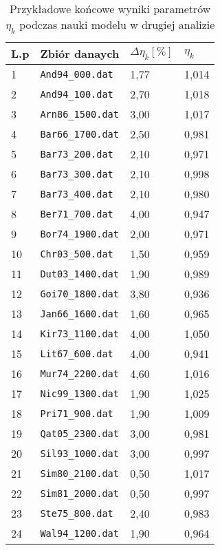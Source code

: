 \documentclass[11pt]{book}
\theoremstyle{definition}
\begin{document}
%
\begin{table}
	\centering
	\caption{Przykładowe końcowe wyniki parametrów $\eta_k$ podczas nauki modelu w drugiej analizie}\label{tab:etak} 
	\begin{tabular}{p{2cm}p{5cm}p{2.5cm}p{2.5cm}}
		\hline 
		L.p & Zbiór danaych & $\Delta \eta_k [\%]$ & $\eta_k$  \\\hline
		1& \texttt{And94\_000.dat}&1,77&1,014\\ \hline
		2& \texttt{And94\_100.dat}&2,70&1,018\\ \hline
		3& \texttt{Arn86\_1500.dat}&3,00&1,017\\ \hline
		4& \texttt{Bar66\_1700.dat}&2,50&0,981\\ \hline
		5& \texttt{Bar73\_200.dat}&2,10&0,971\\ \hline
		6& \texttt{Bar73\_300.dat}&2,10&0,998\\ \hline
		7& \texttt{Bar73\_400.dat}&2,10&0,980\\ \hline
		8& \texttt{Ber71\_700.dat}&4,00&0,947\\ \hline
		9& \texttt{Bor74\_1900.dat}&2,00&0,971\\ \hline
		10& \texttt{Chr03\_500.dat}&1,50&0,959\\ \hline
		11& \texttt{Dut03\_1400.dat}&1,90&0,989\\ \hline
		12& \texttt{Goi70\_1800.dat}&3,80&0,936\\ \hline
		13& \texttt{Jan66\_1600.dat}&1,60&0,965\\ \hline
		14& \texttt{Kir73\_1100.dat}&4,00&1,050\\ \hline
		15& \texttt{Lit67\_600.dat}&4,00&0,941\\ \hline
		16& \texttt{Mur74\_2200.dat}&4,60&1,016\\ \hline
		17& \texttt{Nic99\_1300.dat}&1,90&1,025\\ \hline
		18& \texttt{Pri71\_900.dat}&1,90&1,009\\ \hline
		19& \texttt{Qat05\_2300.dat}&3,00&0,981\\ \hline
		20& \texttt{Sil93\_1000.dat}&3,00&0,997\\ \hline
		21& \texttt{Sim80\_2100.dat}&0,50&1,017\\ \hline
		22& \texttt{Sim81\_2000.dat}&0,50&0,997\\ \hline
		23& \texttt{Ste75\_800.dat}&2,40&0,983\\ \hline
		24& \texttt{Wal94\_1200.dat}&1,90&0,964\\ \hline
	\end{tabular}
\end{table}
\end{document}
